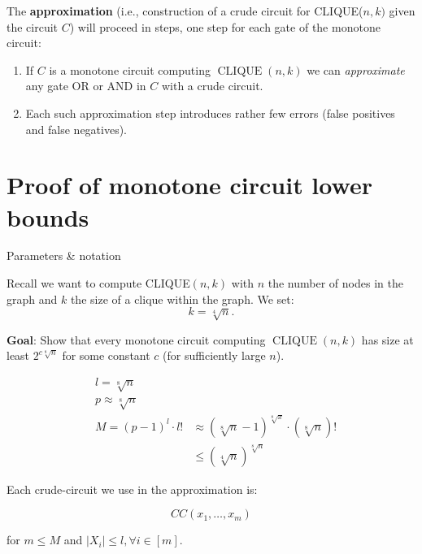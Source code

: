 The \textbf{approximation} (i.e., construction of a crude circuit for CLIQUE(${n},{k})$ given the circuit $C$) will proceed in steps, one step for each gate of the monotone circuit:

\begin{enumerate}
    
\item If $C$ is a monotone circuit computing $\operatorname{CLIQUE}({n}, {k})$ we can \textit{approximate} any gate OR or AND in $C$ with a crude circuit.

\item Each such approximation step introduces rather few errors (false positives and false negatives).
\end{enumerate}


\section{Proof of monotone circuit lower bounds}

\begin{trailer}{Parameters \& notation}

Recall we want to compute CLIQUE$(n, k)$
with $n$ the number of nodes in the graph and $k$ the size of a clique within the graph. 
We set:
$$
k=\sqrt[4]{n}.
$$

\begin{svgraybox}\textbf{Goal}: Show that every monotone circuit computing $\operatorname{CLIQUE}(n,k)$ has size at least $2^{c \sqrt[8]{n}}$ for some constant $c$ (for sufficiently large $n$).
\end{svgraybox}

$$
\begin{aligned}
& l=\sqrt[8]{n} \\
& p \approx \sqrt[8]{n} \\
& M=(p-1)^l \cdot l! & \approx(\sqrt[8]{n}-1)^{\sqrt[8]{x}} \cdot(\sqrt[8]{n})! \\
& & \leq(\sqrt[4]{n})^{\sqrt[8]{n}}
\end{aligned}
$$


Each crude-circuit we use in the approximation is:

$$
C C\left(x_1, \ldots, x_m\right)
$$

for $m \leqslant M$ and $\left|X_i\right| \leqslant l, \forall i \in[m]$.

\end{trailer}

\bigskip 

\newpage
 

